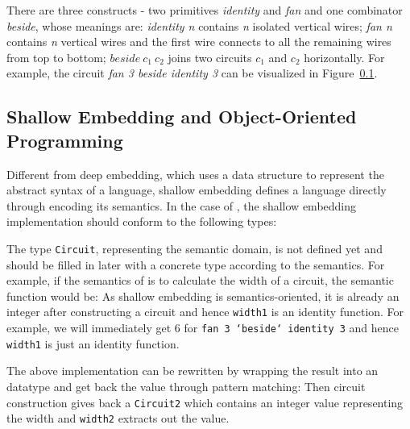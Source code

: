 
There are three constructs - two primitives
\emph{identity} and \emph{fan} and one combinator \emph{beside}, whose
meanings are: \emph{identity n} contains \emph{n} isolated vertical wires;
\emph{fan n} contains \emph{n} vertical wires and the first wire connects to
all the remaining wires from top to bottom; $beside\ c_1\ c_2$ joins two circuits
$c_1$ and $c_2$ horizontally.
For example, the circuit \emph{fan 3 beside identity 3} can be visualized in Figure~\ref{}.

\subsection{Shallow Embedding and Object-Oriented Programming}
Different from deep embedding, which uses a data structure to represent the
abstract syntax of a language, shallow embedding defines a language
directly through encoding its semantics. In the case of \dsl,
the shallow embedding implementation should conform to the following types:

The type \texttt{Circuit}, representing the semantic domain, is not defined yet
and should be filled in later with a concrete type according to the semantics.
For example, if the semantics of \dsl is to calculate the width of a
circuit, the semantic function would be:
As shallow embedding is semantics-oriented, it is already an integer after
constructing a circuit and hence \texttt{width1} is an identity function.
For example, we will immediately get $6$ for
\texttt{fan 3 `beside` identity 3} and hence \texttt{width1} is just an identity function.

The above implementation can be rewritten by wrapping the result into an
datatype and get back the value through pattern matching:
Then circuit construction gives back a \texttt{Circuit2} which contains an
integer value representing the width and \texttt{width2} extracts out the value.

